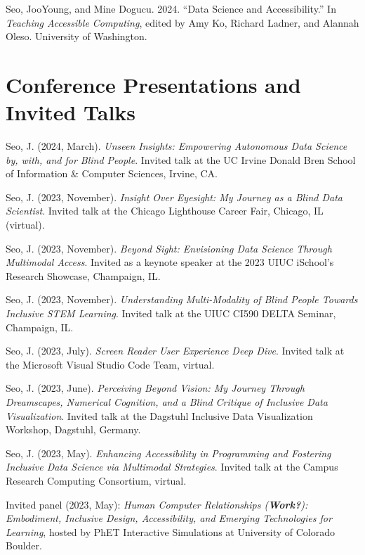 \documentclass[11pt,a4paper,]{awesome-cv}
\newlength{\cslhangindent}
\newenvironment{CSLReferences}[2] %
 {\begin{list}{}{%
  \setlength{\itemindent}{0pt}
  \setlength{\leftmargin}{0pt}
  \setlength{\parsep}{0pt}
  \ifodd #1
   \setlength{\leftmargin}{\cslhangindent}
   \setlength{\itemindent}{-1\cslhangindent}
  \fi
  \setlength{\itemsep}{#2\baselineskip}}}
 {\end{list}}
\begin{document}
\label{refs-a989a3d82cf00293d83f5c3a7efb2b00}
\begin{CSLReferences}{1}{0}
Seo, JooYoung, and Mine Dogucu. 2024. {``Data Science and
Accessibility.''} In \emph{Teaching Accessible Computing}, edited by Amy
Ko, Richard Ladner, and Alannah Oleso. University of Washington.

\end{CSLReferences}

\section{Conference Presentations and Invited
Talks}\label{conference-presentations-and-invited-talks}

Seo, J. (2024, March). \emph{Unseen Insights: Empowering Autonomous Data
Science by, with, and for Blind People}. Invited talk at the UC Irvine
Donald Bren School of Information \& Computer Sciences, Irvine, CA.

Seo, J. (2023, November). \emph{Insight Over Eyesight: My Journey as a
Blind Data Scientist}. Invited talk at the Chicago Lighthouse Career
Fair, Chicago, IL (virtual).

Seo, J. (2023, November). \emph{Beyond Sight: Envisioning Data Science
Through Multimodal Access}. Invited as a keynote speaker at the 2023
UIUC iSchool's Research Showcase, Champaign, IL.

Seo, J. (2023, November). \emph{Understanding Multi-Modality of Blind
People Towards Inclusive STEM Learning}. Invited talk at the UIUC CI590
DELTA Seminar, Champaign, IL.

Seo, J. (2023, July). \emph{Screen Reader User Experience Deep Dive}.
Invited talk at the Microsoft Visual Studio Code Team, virtual.

Seo, J. (2023, June). \emph{Perceiving Beyond Vision: My Journey Through
Dreamscapes, Numerical Cognition, and a Blind Critique of Inclusive Data
Visualization}. Invited talk at the Dagstuhl Inclusive Data
Visualization Workshop, Dagstuhl, Germany.

Seo, J. (2023, May). \emph{Enhancing Accessibility in Programming and
Fostering Inclusive Data Science via Multimodal Strategies}. Invited
talk at the Campus Research Computing Consortium, virtual.

Invited panel (2023, May): \emph{Human Computer Relationships
(\textbf{Work?}): Embodiment, Inclusive Design, Accessibility, and
Emerging Technologies for Learning}, hosted by PhET Interactive
Simulations at University of Colorado Boulder.
\end{document}
